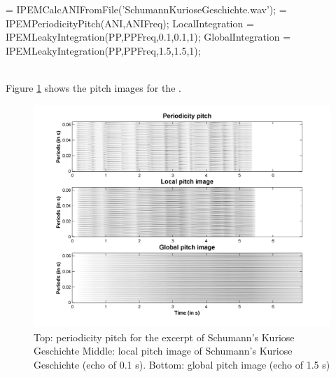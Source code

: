 \begin{IPEMCodeEnvironment}
 = IPEMCalcANIFromFile('SchumannKurioseGeschichte.wav');
 = IPEMPeriodicityPitch(ANI,ANIFreq);
\newline LocalIntegration = IPEMLeakyIntegration(PP,PPFreq,0.1,0.1,1);
\newline GlobalIntegration = IPEMLeakyIntegration(PP,PPFreq,1.5,1.5,1);
\end{IPEMCodeEnvironment}\\

Figure \ref{Fig:EMMPitchImages} shows the pitch images for the
.

\begin{figure}[h]
    \centering
    \includegraphics[width=\IPEMDefaultFigureWidth]{Graphics/EMMPitchImages}
    \caption{Top: periodicity pitch for the excerpt of Schumann's Kuriose Geschichte
    Middle: local pitch image of Schumann's Kuriose Geschichte (echo of 0.1 s).
    Bottom: global pitch image (echo of 1.5 s)}
    \label{Fig:EMMPitchImages}
\end{figure}
